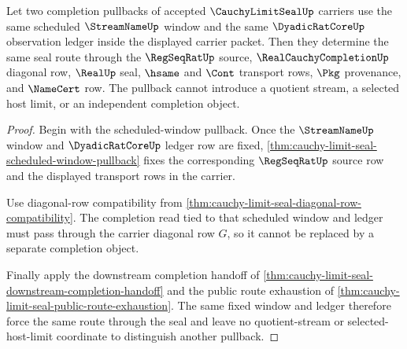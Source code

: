 \begin{theorem}
\label{thm:cauchy-limit-seal-pullback-determinacy}
Let two completion pullbacks of accepted $\CauchyLimitSealUp$ carriers use the same scheduled $\StreamNameUp$ window and the same $\DyadicRatCoreUp$ observation ledger inside the displayed carrier packet. Then they determine the same seal route through the $\RegSeqRatUp$ source, $\RealCauchyCompletionUp$ diagonal row, $\RealUp$ seal, $\hsame$ and $\Cont$ transport rows, $\Pkg$ provenance, and $\NameCert$ row. The pullback cannot introduce a quotient stream, a selected host limit, or an independent completion object.
\end{theorem}
\begin{proof}
Begin with the scheduled-window pullback. Once the $\StreamNameUp$ window and $\DyadicRatCoreUp$ ledger row are fixed, \autoref{thm:cauchy-limit-seal-scheduled-window-pullback} fixes the corresponding $\RegSeqRatUp$ source row and the displayed transport rows in the carrier.

Use diagonal-row compatibility from \autoref{thm:cauchy-limit-seal-diagonal-row-compatibility}. The completion read tied to that scheduled window and ledger must pass through the carrier diagonal row $G$, so it cannot be replaced by a separate completion object.

Finally apply the downstream completion handoff of \autoref{thm:cauchy-limit-seal-downstream-completion-handoff} and the public route exhaustion of \autoref{thm:cauchy-limit-seal-public-route-exhaustion}. The same fixed window and ledger therefore force the same route through the seal and leave no quotient-stream or selected-host-limit coordinate to distinguish another pullback.
\end{proof}

